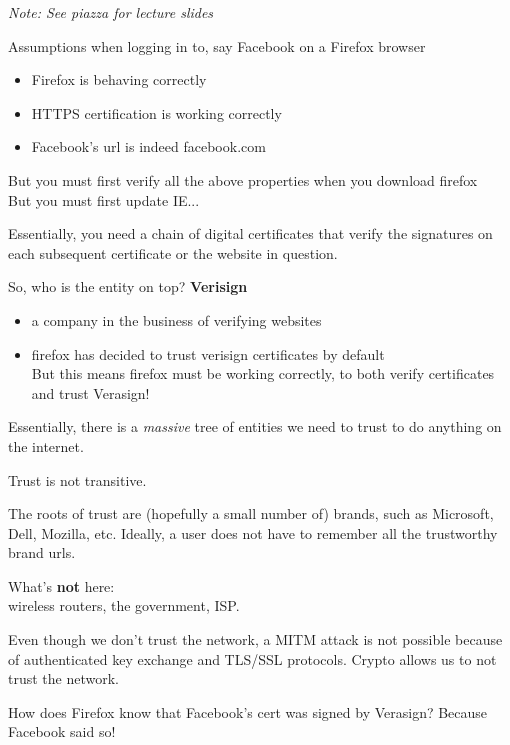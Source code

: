 \textit{Note: See piazza for lecture slides}

Assumptions when logging in to, say Facebook on a Firefox browser
\begin{itemize}
    \item Firefox is behaving correctly
    \item HTTPS certification is working correctly
    \item Facebook's url is indeed facebook.com
\end{itemize}

But you must first verify all the above properties when you download firefox\\
But you must first update IE...

Essentially, you need a chain of digital certificates that verify the signatures
on each subsequent certificate or the website in question.  

So, who is the entity on top?
{\bf Verisign}\\
\begin{itemize}
    \item a company in the business of verifying websites
    \item firefox has decided to trust verisign certificates by default\\
        But this means firefox must be working correctly, to both verify
        certificates and trust Verasign!
\end{itemize}

Essentially, there is a \textit{massive} tree of entities we need to trust to do
anything on the internet.

Trust is not transitive. 

The roots of trust are (hopefully a small number of) brands, such as
Microsoft, Dell, Mozilla, etc. Ideally, a user does not have to remember all
the trustworthy brand urls.

What's \textbf{not} here:\\
wireless routers, the government, ISP.

Even though we don't trust the network, a MITM attack is not possible because of
authenticated key exchange and TLS/SSL protocols. Crypto allows us to not trust the
network.

How does Firefox know that Facebook's cert was signed by Verasign? Because Facebook said so!  

